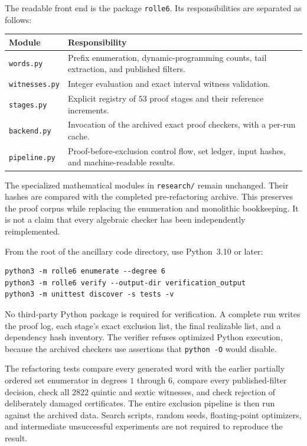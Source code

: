 \documentclass[11pt]{article}
\theoremstyle{definition}
\begin{document}
The readable front end is the package \texttt{rolle6}. Its responsibilities
are separated as follows:
\begin{center}\small
\begin{tabular}{lp{.64\linewidth}}
\toprule
Module&Responsibility\\
\midrule
\texttt{words.py}&Prefix enumeration, dynamic-programming counts, tail extraction, and published filters.\\
\texttt{witnesses.py}&Integer evaluation and exact interval witness validation.\\
\texttt{stages.py}&Explicit registry of $53$ proof stages and their reference increments.\\
\texttt{backend.py}&Invocation of the archived exact proof checkers, with a per-run cache.\\
\texttt{pipeline.py}&Proof-before-exclusion control flow, set ledger, input hashes, and machine-readable results.\\
\bottomrule
\end{tabular}
\end{center}
The specialized mathematical modules in \texttt{research/} remain unchanged.
Their hashes are compared with the completed pre-refactoring archive.
This preserves the proof corpus while replacing the enumeration and
monolithic bookkeeping. It is not a claim that every algebraic checker
has been independently reimplemented.

From the root of the ancillary code directory, use Python~3.10 or later:
\begin{lstlisting}
python3 -m rolle6 enumerate --degree 6
python3 -m rolle6 verify --output-dir verification_output
python3 -m unittest discover -s tests -v
\end{lstlisting}
No third-party Python package is required for verification. A complete
run writes the proof log, each stage's exact exclusion list, the final
realizable list, and a dependency hash inventory. The verifier refuses
optimized Python execution, because the archived checkers use assertions
that \texttt{python -O} would disable.

The refactoring tests compare every generated word with the earlier
partially ordered set enumerator in degrees $1$ through $6$, compare every
published-filter decision, check all $2822$ quintic and sextic witnesses,
and check rejection of deliberately damaged certificates. The entire
exclusion pipeline is then run against the archived data. Search scripts,
random seeds, floating-point optimizers, and intermediate unsuccessful
experiments are not required to reproduce the result.
\end{document}
